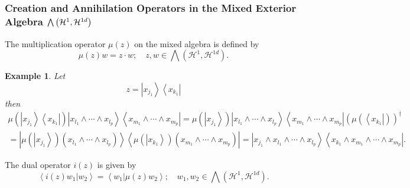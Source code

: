\documentclass[aps,preprint]{revtex4}%
\newtheorem{example}[theorem]{Example}
\begin{document}
\subsubsection{Creation and Annihilation Operators in the Mixed Exterior
Algebra $%
{\textstyle\protect\bigwedge}
\left(  \mathcal{H}^{1},\mathcal{H}^{1d}\right)  $}

The multiplication operator $\mu\left(  z\right)  $ on the mixed algebra is
defined by
\begin{equation}
\mu\left(  z\right)  w=z\cdot w;\quad z,w\in%
{\textstyle\bigwedge}
\left(  \mathcal{H}^{1},\mathcal{H}^{1d}\right)  .
\end{equation}


\begin{example}
Let
\begin{equation}
z=\left\vert x_{j_{1}}\right\rangle \left\langle x_{k_{1}}\right\vert
\end{equation}
then%
\begin{gather}
\mu\left(  \left\vert x_{j_{1}}\right\rangle \left\langle x_{k_{1}}\right\vert
\right)  \left\vert x_{l_{1}}\wedge\cdots\wedge x_{l_{p}}\right\rangle
\left\langle x_{m_{1}}\wedge\cdots\wedge x_{m_{p}}\right\vert =\mu\left(
\left\vert x_{j_{1}}\right\rangle \right)  \left\vert x_{l_{1}}\wedge
\cdots\wedge x_{l_{p}}\right\rangle \left\langle x_{m_{1}}\wedge\cdots\wedge
x_{m_{p}}\right\vert \left(  \mu\left(  \left\langle x_{k_{1}}\right\vert
\right)  \right)  ^{\dagger}\\
=\left\vert \mu\left(  \left\vert x_{j_{1}}\right\rangle \right)  \left(
x_{l_{1}}\wedge\cdots\wedge x_{l_{p}}\right)  \right\rangle \left\langle
\mu\left(  \left\vert x_{k_{1}}\right\rangle \right)  \left(  x_{m_{1}}%
\wedge\cdots\wedge x_{m_{p}}\right)  \right\vert =\left\vert x_{j_{1}}\wedge
x_{l_{1}}\wedge\cdots\wedge x_{l_{p}}\right\rangle \left\langle x_{k_{1}%
}\wedge x_{m_{1}}\wedge\cdots\wedge x_{m_{p}}\right\vert .
\end{gather}

\end{example}

\bigskip The dual operator $i\left(  z\right)  $ is given by
\begin{equation}
\left\langle \left.  i\left(  z\right)  w_{1}\right\vert w_{2}\right\rangle
=\left\langle \left.  w_{1}\right\vert \mu\left(  z\right)  w_{2}\right\rangle
;\quad w_{1},w_{2}\in%
{\textstyle\bigwedge}
\left(  \mathcal{H}^{1},\mathcal{H}^{1d}\right)  .
\end{equation}
\end{document}
